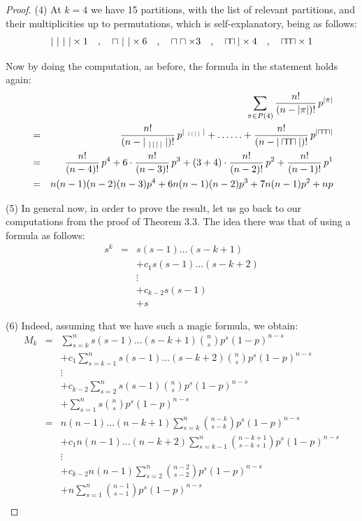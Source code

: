 \documentclass[12pt]{amsbook}
\begin{document}
\begin{proof}
(4) At $k=4$ we have 15 partitions, with the list of relevant partitions, and their multiplicities up to permutations, which is self-explanatory, being as follows:
$$|\ |\ |\ |\times1\quad,\quad \sqcap\ |\ |\times 6\quad,\quad \sqcap\sqcap\times 3
\quad,\quad \sqcap\hskip-1.6mm\sqcap|\times4\quad,\quad \sqcap\hskip-1.6mm\sqcap\hskip-1.6mm\sqcap\times1$$

Now by doing the computation, as before, the formula in the statement holds again:
\begin{eqnarray*}
&&\sum_{\pi\in P(4)}\frac{n!}{(n-|\pi|)!}\,p^{|\pi|}\\
&=&\frac{n!}{(n-|{\ }_{|\,|\,|\,|}\;|)!}\,p^{|{\ }_{|\,|\,|\,|}\;|}+\ldots\ldots+\frac{n!}{(n-|\sqcap\hskip-1.6mm\sqcap\hskip-1.6mm\sqcap|)!}\,p^{|\sqcap\hskip-0.57mm\sqcap\hskip-0.57mm\sqcap|}\\
&=&\frac{n!}{(n-4)!}\,p^4+6\cdot\frac{n!}{(n-3)!}\,p^3+(3+4)\cdot\frac{n!}{(n-2)!}\,p^2+\frac{n!}{(n-1)!}\,p^1\\
&=&n(n-1)(n-2)(n-3)p^4+6n(n-1)(n-2)p^3+7n(n-1)p^2+np
\end{eqnarray*}

(5) In general now, in order to prove the result, let us go back to our computations from the proof of Theorem 3.3. The idea there was that of using a formula as follows:
\begin{eqnarray*}
s^k
&=&s(s-1)\ldots(s-k+1)\\
&&+c_1s(s-1)\ldots (s-k+2)\\
&&\vdots\\
&&+c_{k-2}s(s-1)\\
&&+s
\end{eqnarray*}

(6) Indeed, assuming that we have such a magic formula, we obtain:
\begin{eqnarray*}
M_k
&=&\sum_{s=k}^ns(s-1)\ldots(s-k+1)\binom{n}{s}p^s(1-p)^{n-s}\\
&&+c_1\sum_{s=k-1}^ns(s-1)\ldots (s-k+2)\binom{n}{s}p^s(1-p)^{n-s}\\
&&\vdots\\
&&+c_{k-2}\sum_{s=2}^ns(s-1)\binom{n}{s}p^s(1-p)^{n-s}\\
&&+\sum_{s=1}^ns\binom{n}{s}p^s(1-p)^{n-s}\\
&=&n(n-1)\ldots(n-k+1)\sum_{s=k}^n\binom{n-k}{s-k}p^s(1-p)^{n-s}\\
&&+c_1n(n-1)\ldots (n-k+2)\sum_{s=k-1}^n\binom{n-k+1}{s-k+1}p^s(1-p)^{n-s}\\
&&\vdots\\
&&+c_{k-2}n(n-1)\sum_{s=2}^n\binom{n-2}{s-2}p^s(1-p)^{n-s}\\
&&+n\sum_{s=1}^n\binom{n-1}{s-1}p^s(1-p)^{n-s}\\
&
\end{eqnarray*}


\end{proof}
\end{document}
